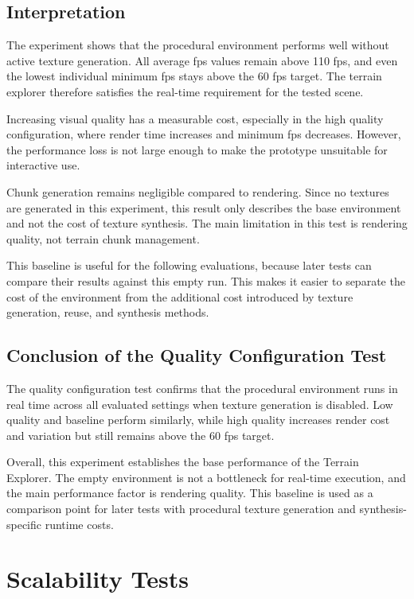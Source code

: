 \subsection{Interpretation}

The experiment shows that the procedural environment performs well without active texture generation. All average \gls{fps} values remain above 110 \gls{fps}, and even the lowest individual minimum \gls{fps} stays above the 60 \gls{fps} target. The terrain explorer therefore satisfies the real-time requirement for the tested scene.

Increasing visual quality has a measurable cost, especially in the high quality configuration, where render time increases and minimum \gls{fps} decreases. However, the performance loss is not large enough to make the prototype unsuitable for interactive use.

Chunk generation remains negligible compared to rendering. Since no textures are generated in this experiment, this result only describes the base environment and not the cost of texture synthesis. The main limitation in this test is rendering quality, not terrain chunk management.

This baseline is useful for the following evaluations, because later tests can compare their results against this empty run. This makes it easier to separate the cost of the environment from the additional cost introduced by texture generation, reuse, and synthesis methods.

\subsection{Conclusion of the Quality Configuration Test}

The quality configuration test confirms that the procedural environment runs in real time across all evaluated settings when texture generation is disabled. Low quality and baseline perform similarly, while high quality increases render cost and variation but still remains above the 60 \gls{fps} target.

Overall, this experiment establishes the base performance of the Terrain Explorer. The empty environment is not a bottleneck for real-time execution, and the main performance factor is rendering quality. This baseline is used as a comparison point for later tests with procedural texture generation and synthesis-specific runtime costs.

\section{Scalability Tests}

